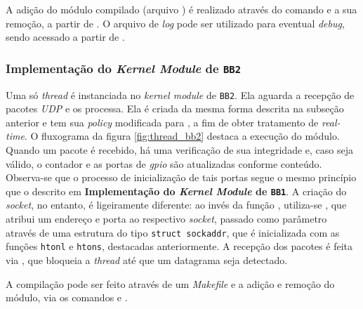 \vspace{12pt}

A adição do módulo compilado (arquivo ) é realizado através do comando
 e a sua remoção, a partir de . O arquivo
de \textit{log} pode ser utilizado para eventual \textit{debug}, sendo acessado
a partir de .

\subsubsection{Implementação do \textit{Kernel Module} de \texttt{BB2}}

Uma só \textit{thread} é instanciada no \textit{kernel module} de \texttt{BB2}.
Ela aguarda a recepção de pacotes \textit{UDP} e os processa. Ela é criada da
mesma forma descrita na subseção anterior e tem sua \textit{policy} modificada
para , a fim de obter tratamento de \textit{real-time}. O
fluxograma da figura \ref{fig:thread_bb2} destaca a execução do módulo. Quando
um pacote é recebido, há uma verificação de sua integridade e, caso seja válido,
o contador e as portas de \textit{gpio} são atualizadas conforme conteúdo.
Observa-se que o processo de inicialização de tais portas segue o mesmo
princípio que o descrito em \textbf{Implementação do \textit{Kernel Module} de
\texttt{BB1}}. A criação do \textit{socket}, no entanto, é ligeiramente
diferente: ao invés da função , utiliza-se , que
atribui um endereço e porta ao respectivo \textit{socket}, passado como
parâmetro através de uma estrutura do tipo \texttt{struct sockaddr}, que é
inicializada com as funções \texttt{htonl} e \texttt{htons}, destacadas
anteriormente. A recepção dos pacotes é feita via , que
bloqueia a \textit{thread} até que um datagrama seja detectado.

\vspace{12pt}

A compilação pode ser feito através de um \textit{Makefile} e a adição e remoção
do módulo, via os comandos  e .

\FloatBarrier

